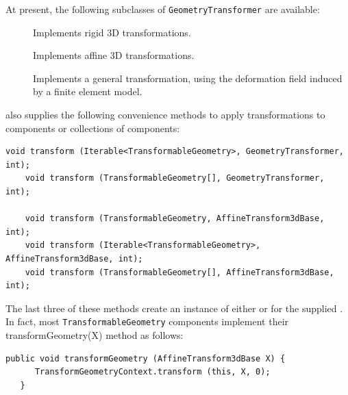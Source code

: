 At present, the following subclasses of {\tt GeometryTransformer} are
available:

\begin{description}

\item[]\mbox{}

Implements rigid 3D transformations.

\item[]\mbox{}

Implements affine 3D transformations.

\item[]\mbox{}

Implements a general transformation, using the deformation field
induced by a finite element model. 

\end{description}

 also
supplies the following convenience methods to apply transformations to
components or collections of components:
%
\begin{lstlisting}[]
    void transform (Iterable<TransformableGeometry>, GeometryTransformer, int);
    void transform (TransformableGeometry[], GeometryTransformer, int);

    void transform (TransformableGeometry, AffineTransform3dBase, int);
    void transform (Iterable<TransformableGeometry>, AffineTransform3dBase, int);
    void transform (TransformableGeometry[], AffineTransform3dBase, int);
\end{lstlisting}
%
The last three of these methods create an instance of either
 or
 for the supplied
. In fact, most
{\tt TransformableGeometry} components implement their
%
{transformGeometry(X)} method as follows:
%
\begin{lstlisting}[]
   public void transformGeometry (AffineTransform3dBase X) {
      TransformGeometryContext.transform (this, X, 0);
   }
\end{lstlisting}
%

